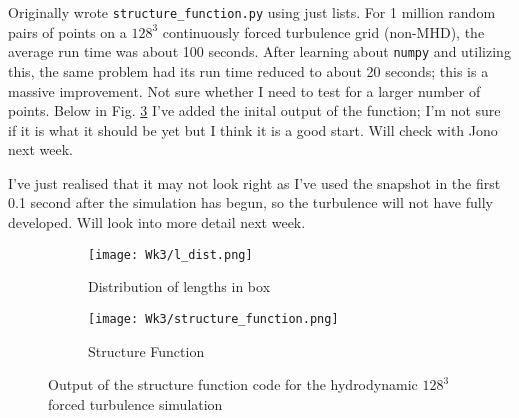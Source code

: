 \documentclass[12pt,letterpaper]{article}
\begin{document}
  Originally wrote \verb|structure_function.py| using just lists. For 1 million random pairs of points on a $128^3$ continuously forced turbulence grid (non-MHD), the average run time was about 100 seconds. After learning about \verb|numpy| and utilizing this, the same problem had its run time reduced to about 20 seconds; this is a massive improvement. Not sure whether I need to test for a larger number of points. Below in Fig. \ref{fig:structure_plots} I've added the inital output of the function; I'm not sure if it is what it should be yet but I think it is a good start. Will check with Jono next week.

  I've just realised that it may not look right as I've used the snapshot in the first 0.1 second after the simulation has begun, so the turbulence will not have fully developed. Will look into more detail next week.

  \begin{figure}[!h]
   \centering
  \begin{subfigure}{.4\linewidth}
    \centering
  \texttt{[image: Wk3/l\_dist.png]}
  \caption{Distribution of lengths in box}
  \label{fig:l_dist}
  \end{subfigure}
  \begin{subfigure}{.4\linewidth}
    \centering
  \texttt{[image: Wk3/structure\_function.png]}
  \caption{Structure Function}
  \label{fig:struct_func}
  \end{subfigure}

  \caption{Output of the structure function code for the hydrodynamic $128^3$ forced turbulence simulation}
  \label{fig:structure_plots}
  \end{figure}
\end{document}
